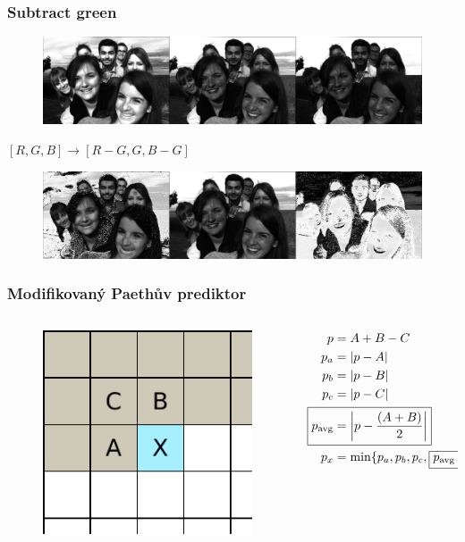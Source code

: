 \documentclass{beamer}
\begin{document}
\begin{frame}
  \center
  \frametitle{Subtract green}
  \begin{figure}
    \includegraphics[width=\textwidth]{friends_orig.jpg}
  \end{figure}
  $[R, G, B] \rightarrow [R - G, G, B - G]$
  \begin{figure}
    \includegraphics[width=\textwidth]{friends_transformed.jpg}
  \end{figure}
\end{frame}

\begin{frame}
  \center
  \frametitle{Modifikovaný Paethův prediktor}
  \begin{columns}
    \begin{column}{0.5\textwidth}
     \begin{figure}
       \includegraphics[height=0.4\textheight]{prediction.pdf}
     \end{figure}
    \end{column}
    \begin{column}{0.5\textwidth}
      \begin{align*}
        \begin{split}
        p &= A + B - C\\
        p_a &= |p - A|\\
        p_b &= |p - B|\\
        p_c &= |p - C|\\
        \Aboxed{p_\mathrm{avg} &= \left|p - \frac{(A + B)}{2}\right|}\\
        p_x &= \mathrm{min}\{p_a, p_b, p_c, \boxed{p_\mathrm{avg}}\}
      \end{split}
    \end{align*}

\end{column}
  \end{columns}
\end{frame}
\end{document}
